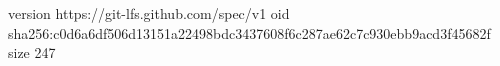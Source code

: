 version https://git-lfs.github.com/spec/v1
oid sha256:c0d6a6df506d13151a22498bdc3437608f6c287ae62c7c930ebb9acd3f45682f
size 247
